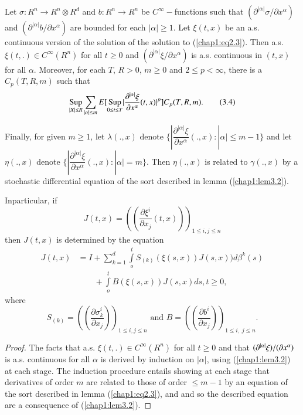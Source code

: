 \setcounter{theorem}{2}
\begin{theorem}\label{chap1:thm3.3}%
Let $\sigma: R^n \to R^n \otimes R^d$ and $b:R^n \to R^n$ be $C^
\infty-$functions such that $(\partial^{|\alpha|}\sigma / \partial
x^\alpha)$ and $(\partial^{|\alpha|} b / \partial x^\alpha)$ are bounded 
for each $|\alpha|\ge 1$. Let $\xi(t,x)$ be an a.s. continuous
version of the solution of the solution to (\ref{chap1:eq2.3}). Then
a.s. $\xi(t,.) \in C^ \infty (R^n)$ for all $t \ge 0$ and
$(\partial^{|\alpha|}\xi /\partial x^\alpha)$ is a.s. continuous
in $(t,x)$ for all $\alpha$. Moreover, for each $T$, $R >0$, $m \ge 0$ and
$2 \le p < \infty$, there is a $C_p (T,R,m)$ such that 
\begin{equation*}
\underset {|X|\le R} {\operatorname{Sup}} \sum_{|\alpha|\le m} E [\underset {0 \le t
    \le T} {\operatorname{Sup}} |\frac{\partial ^{|\alpha|}\xi}{\partial x^ \alpha}
  (t,x)|^p ] C_p (T,R,m). \tag{3.4}\label{chap1:eq3.4}    
\end{equation*}
\end{theorem}

Finally, for given $m \ge 1$, let $\lambda (.,x)$ denote $\bigg \{
|\dfrac{\partial ^{|\alpha|}\xi}{\partial x^ \alpha} (.,x):|\alpha|\le
m-1 \bigg \}$ and let $\eta (.,x)$ denote $\bigg \{ |
\dfrac{\partial^{|\alpha|}\xi}{\partial x^\alpha} (.,x):|\alpha|= m
\bigg \}$. Then $\eta (.,x)$ is related to $\gamma (.,x)$ by a
stochastic differential equation of the sort described in lemma
(\ref{chap1:lem3.2}).  

In\pageoriginale particular, if
\begin{equation*}
J(t,x)= ((\frac{\partial \xi^i}{ \partial x_j}(t,x)))_{1 \le i,j \le n}
\tag{3.5}\label{chap1:eq3.5}    
\end{equation*}
then $J(t,x)$ is determined by the equation
\begin{align*}
J(t,x) & = I + \sum_{k=1}^d \int\limits^t_o S_{(k)} (\xi
(s,x))J(s,x))d \beta^k (s)\\
& \qquad + \int \limits^t_o B (\xi (s,x))J (s,x)ds,
t \ge 0, \tag{3.6}\label{chap1:eq3.6}    
\end{align*}
where
$$
S_{(k)}= ((\frac{\partial \sigma ^i _k}{\partial x_j}))_{1 \le i,j \le
  n} \text{ and } B =((\frac{\partial b^i}{\partial x_j}))_{{1 \le i,\;j
    \le n}}. 
$$

\begin{proof}
The facts that a.s. $\xi (t,.) \in C^ \infty (R^n)$ for all $t \ge 0$
and that $(\partial ^{|\alpha|} \xi)/\break (\partial x^\alpha)$ is a.s.
continuous for all $\alpha$ is derived by induction on $|\alpha|$,
using (\ref{chap1:lem3.2}) at each stage. The induction procedure
entails showing 
at each stage that derivatives of order $m$ are related to those of
order $\le m-1$ by an equation of the sort described in lemma
(\ref{chap1:eq2.3}), 
and and so the described equation are a consequence of (\ref{chap1:lem3.2}).  
\end{proof}

